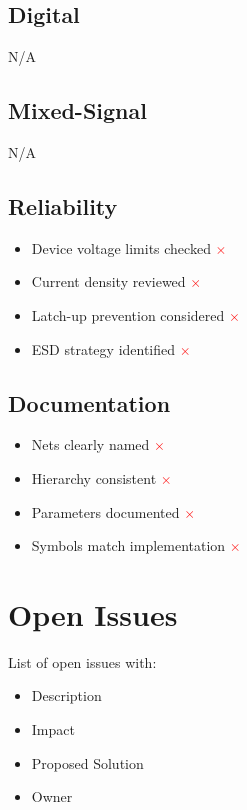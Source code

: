 \documentclass{article}
\begin{document}
\subsection{Digital}

N/A

\subsection{Mixed-Signal}

N/A

\subsection{Reliability}

\begin{itemize}
    \item{Device voltage limits checked \textcolor{red}{$\times$}}
    \item{Current density reviewed \textcolor{red}{$\times$}}
    \item{Latch-up prevention considered \textcolor{red}{$\times$}}
    \item{ESD strategy identified \textcolor{red}{$\times$}}
\end{itemize}

\subsection{Documentation}

\begin{itemize}
    \item{Nets clearly named \textcolor{red}{$\times$}}
    \item{Hierarchy consistent \textcolor{red}{$\times$}}
    \item{Parameters documented \textcolor{red}{$\times$}}
    \item{Symbols match implementation \textcolor{red}{$\times$}}
\end{itemize}

\newpage

\section{Open Issues}

List of open issues with:

\begin{itemize}
    \item{Description}
    \item{Impact}
    \item{Proposed Solution}
    \item{Owner}
\end{itemize}
\end{document}

